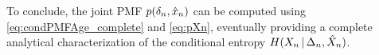 To conclude, the joint PMF $p(\delta_n,\hat{x}_n)$ can be computed using \eqref{eq:condPMFAge_complete} and \eqref{eq:pXn}, eventually providing a complete analytical characterization of the conditional entropy $H(X_n\, | \,\Delta_n,\hat{X}_n)$.


